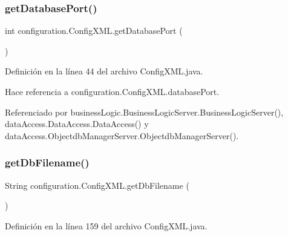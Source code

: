 \subsubsection{\texorpdfstring{getDatabasePort()}{getDatabasePort()}}
{\footnotesize\ttfamily int configuration.\+Config\+X\+M\+L.\+get\+Database\+Port (\begin{DoxyParamCaption}{ }\end{DoxyParamCaption})}



Definición en la línea 44 del archivo Config\+X\+M\+L.\+java.


\begin{DoxyCode}{0}

\end{DoxyCode}


Hace referencia a configuration.\+Config\+X\+M\+L.\+database\+Port.



Referenciado por business\+Logic.\+Business\+Logic\+Server.\+Business\+Logic\+Server(), data\+Access.\+Data\+Access.\+Data\+Access() y data\+Access.\+Objectdb\+Manager\+Server.\+Objectdb\+Manager\+Server().

\mbox{\label{classconfiguration_1_1_config_x_m_l_a403cc4242d937a87dfea24caabaf535d}} 
\subsubsection{\texorpdfstring{getDbFilename()}{getDbFilename()}}
{\footnotesize\ttfamily String configuration.\+Config\+X\+M\+L.\+get\+Db\+Filename (\begin{DoxyParamCaption}{ }\end{DoxyParamCaption})}



Definición en la línea 159 del archivo Config\+X\+M\+L.\+java.


\begin{DoxyCode}{0}

\end{DoxyCode}


